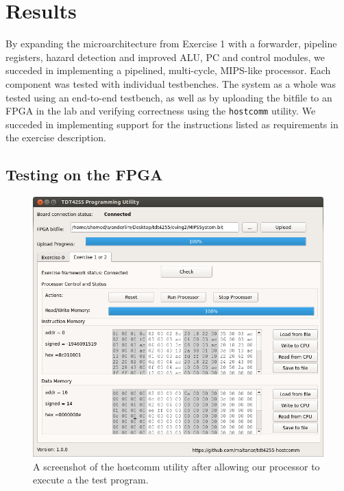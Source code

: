 \chapter{Results}

By expanding the microarchitecture from Exercise 1 \cite{compendium} with a forwarder, pipeline registers, hazard detection and improved ALU, PC and control modules, we succeded in implementing a pipelined, multi-cycle, MIPS-like processor.
Each component was tested with individual testbenches.
The system as a whole was tested using an end-to-end testbench, as well as by uploading the bitfile to an FPGA in the lab and verifying correctness using the \texttt{hostcomm} utility.
We succeded in implementing support for the instructions listed as requirements in the exercise description.

\section{Testing on the FPGA}

\begin{figure}[h!]
    \includegraphics[width=\linewidth]{img/hostcomm_result.png}
    \caption{A screenshot of the hostcomm utility after allowing our processor to execute a the test program.}
    \label{fig:hostcomm}
\end{figure}